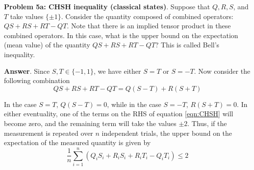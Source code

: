 \textbf{Problem 5a: CHSH inequality (classical states)}. Suppose that $Q, R, S$, and $T$ take values $\{\pm 1\}$. 
Consider the quantity composed of combined operators: $QS + RS + RT - QT$. 
Note that there is an implied tensor product in these combined operators.
In this case, what is the upper bound on the expectation (mean value) of the quantity $QS + RS + RT - QT$? 
This is called Bell's inequality.

\textbf{Answer}. Since $S, T \in \{-1, 1\}$, we have either $S=T$ or $S=-T$.
Now consider the following combination
\begin{equation}
	\label{eqn:CHSH}
	QS + RS + RT - QT = Q(S - T) + R(S + T)
\end{equation}

In the case $S=T$, $Q(S - T) =0$, while in the case $S=-T$, $R(S + T) =0$.
In either eventuality, one of the terms on the RHS of equation \ref{eqn:CHSH} will become zero, and the remaining term will take the values $\pm2$.
Thus, if the measurement is repeated over $n$ independent trials, the upper bound on the expectation of the measured quantity is given by
\begin{equation*}
	\frac{1}{n}\sum_{i=1}^n (Q_iS_i + R_iS_i + R_iT_i - Q_iT_i) \leq 2
\end{equation*}




